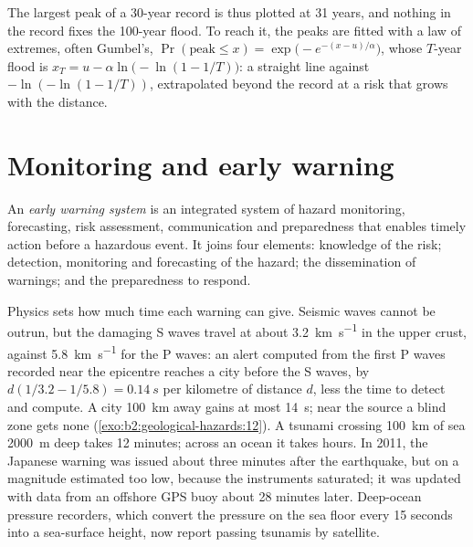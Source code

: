 The largest peak of a 30-year record is thus plotted at 31 years, and nothing in the record fixes
the 100-year flood. To reach it, the peaks are fitted with a law of extremes, often Gumbel's,
$\Pr(\text{peak} \leq x) = \exp\bigl(-e^{-(x - u)/\alpha}\bigr)$, whose $T$-year flood is $x_T = u
- \alpha\ln\bigl(-\ln(1 - 1/T)\bigr)$: a straight line against $-\ln(-\ln(1 - 1/T))$, extrapolated
beyond the record at a risk that grows with the distance.

\section{Monitoring and early warning}\label{sec:b2:geological-hazards:warning}

\begin{definition}\label{def:b2:geological-hazards:warning}
An \emph{early warning system} is an integrated system of hazard
monitoring, forecasting, risk assessment, communication and preparedness that enables timely
action before a hazardous event. It joins four elements: knowledge of the risk; detection,
monitoring and forecasting of the hazard; the dissemination of warnings; and the preparedness to
respond.
\end{definition}

Physics sets how much time each warning can give. Seismic waves cannot be outrun, but the damaging
S waves travel at about \qty{3.2}{km.s^{-1}} in the upper crust, against \qty{5.8}{km.s^{-1}} for
the P waves: an alert computed from the first P waves recorded near the epicentre reaches a city
before the S waves, by $d(1/3.2 - 1/5.8) = \qty{0.14}{s}$ per kilometre of distance $d$, less the
time to detect and compute. A city \qty{100}{km} away gains at most \qty{14}{s}; near the source a
blind zone gets none (\cref{exo:b2:geological-hazards:12}). A tsunami crossing \qty{100}{km} of sea
\qty{2000}{m} deep takes 12 minutes; across an ocean it takes hours. In 2011, the Japanese
warning was issued about three minutes after the earthquake, but on a magnitude estimated too low,
because the instruments saturated; it was updated with data from an offshore GPS buoy about 28 minutes later.
Deep-ocean pressure recorders, which convert the pressure on the sea floor every 15 seconds into a
sea-surface height, now report passing tsunamis by satellite.

